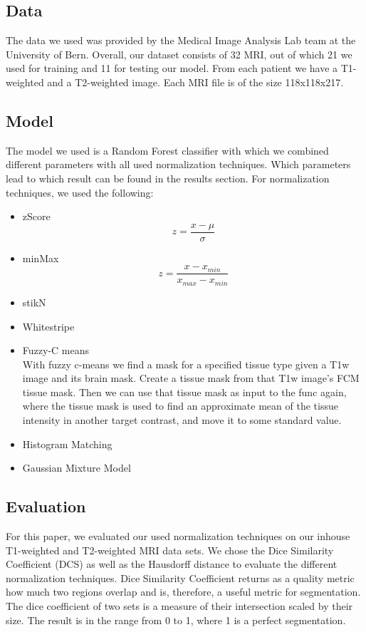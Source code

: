 \documentclass[conference]{IEEEtran}
\begin{document}
\subsection{Data}
	The data we used was provided by the Medical Image Analysis Lab team at the University of Bern. Overall, our dataset consists of 32 MRI,
	out of which 21 we used for training and 11 for testing our model. From each patient we have a T1-weighted and a T2-weighted image. Each MRI file
	is of the size 118x118x217.
\subsection{Model}
	The model we used is a Random Forest classifier with which we combined different parameters with all used normalization techniques. Which parameters
	lead to which result can be found in the results section. For normalization techniques, we used the following:
	\begin{itemize}
		\item zScore
		\begin{equation}
			z = \frac{x - \mu}{\sigma}
		\end{equation}
		\item minMax
		\begin{equation}
			z = \frac{x - x_{min}}{x_{max} - x_{min}}
		\end{equation}
		\item stikN
		\item Whitestripe
		\item Fuzzy-C means\\
		With fuzzy c-means we find a mask for a specified tissue type given a T1w image and its brain mask. Create a tissue mask
		from that T1w image's FCM tissue mask. Then we can use that tissue mask as input to the func again, where the tissue mask is
		used to find an approximate mean of the tissue intensity in	another target contrast, and move it to some standard value.
		\item Histogram Matching
		\item Gaussian Mixture Model
	\end{itemize}
\subsection{Evaluation}
	For this paper, we evaluated our used normalization techniques on our inhouse T1-weighted and T2-weighted MRI data sets. 
	We chose the Dice Similarity Coefficient (DCS) as well as the Hausdorff distance to evaluate the different normalization techniques.
	Dice Similarity Coefficient returns as a quality metric how much two regions overlap and is, therefore, a useful metric for segmentation.
	The dice coefficient of two sets is a measure of their intersection scaled by their size. The result is in the range from 0 to 1, where 1 is a perfect segmentation. 
	
\end{document}
